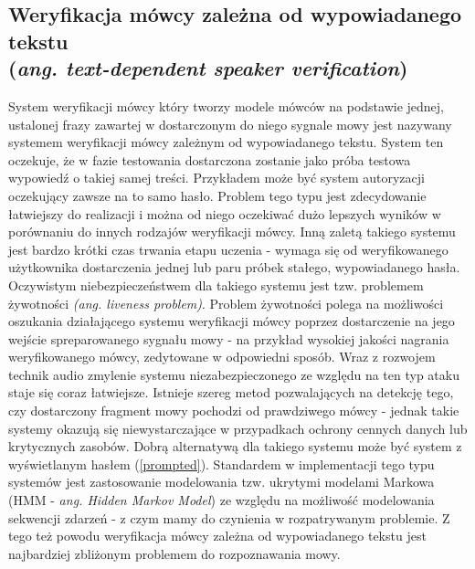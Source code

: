 \subsection{Weryfikacja mówcy zależna od wypowiadanego tekstu \\ (\textit{ang. text-dependent speaker verification})}
\label{liveness}

System weryfikacji mówcy który tworzy modele mówców na podstawie jednej, ustalonej frazy zawartej w dostarczonym do niego sygnale mowy jest nazywany systemem weryfikacji mówcy zależnym od wypowiadanego tekstu. System ten oczekuje, że w fazie testowania dostarczona zostanie jako próba testowa wypowiedź o takiej samej treści. Przykładem może być system autoryzacji oczekujący zawsze na to samo hasło. Problem tego typu jest zdecydowanie łatwiejszy do realizacji i można od niego oczekiwać dużo
lepszych wyników w porównaniu do innych rodzajów weryfikacji mówcy. Inną zaletą takiego systemu jest bardzo krótki czas trwania etapu uczenia - wymaga się od weryfikowanego użytkownika dostarczenia jednej lub paru próbek stałego, wypowiadanego hasła. Oczywistym niebezpieczeństwem dla takiego systemu jest tzw. problemem żywotności \textit{(ang. liveness problem)}. Problem żywotności polega na możliwości oszukania działającego systemu weryfikacji mówcy poprzez dostarczenie na jego wejście
spreparowanego sygnału mowy - na przykład wysokiej jakości nagrania weryfikowanego mówcy, zedytowane w odpowiedni sposób. Wraz z rozwojem technik audio zmylenie systemu niezabezpieczonego ze względu na ten typ ataku staje się coraz łatwiejsze. Istnieje szereg metod pozwalających na detekcję tego, czy dostarczony fragment mowy pochodzi od prawdziwego mówcy - jednak takie systemy okazują się niewystarczające w przypadkach ochrony cennych danych lub krytycznych zasobów. Dobrą alternatywą dla takiego systemu może być system z wyświetlanym hasłem (\ref{prompted}). Standardem w implementacji tego typu systemów jest zastosowanie modelowania tzw. ukrytymi modelami Markowa (HMM - \textit{ang. Hidden Markov Model}) ze względu na możliwość modelowania sekwencji zdarzeń - z czym mamy do czynienia w rozpatrywanym problemie. Z tego też powodu weryfikacja mówcy zależna od wypowiadanego tekstu jest najbardziej zbliżonym problemem do rozpoznawania mowy.

